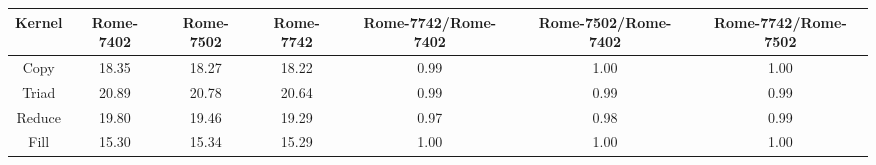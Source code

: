 \begin{tabular}{|c|c|c|c|c|c|c|}  \hline
Kernel&Rome-7402&Rome-7502&Rome-7742 & Rome-7742/Rome-7402 & Rome-7502/Rome-7402 & Rome-7742/Rome-7502 \\ \hline 
Copy & 18.35 & 18.27 & 18.22  & 0.99 & 1.00 & 1.00 \\ \hline 
Triad & 20.89 & 20.78 & 20.64  & 0.99 & 0.99 & 0.99 \\ \hline 
Reduce & 19.80 & 19.46 & 19.29  & 0.97 & 0.98 & 0.99 \\ \hline 
Fill & 15.30 & 15.34 & 15.29  & 1.00 & 1.00 & 1.00 \\ \hline 
\end{tabular}
